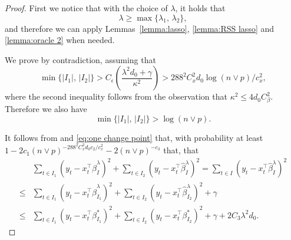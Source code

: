 \documentclass[twoside]{article}
\begin{document}
\begin{proof} 
First we notice that with the choice of $\lambda$, it holds that 
	\[
		\lambda \geq \max\{\lambda_1, \, \lambda_2\},
	\]
	and therefore we can apply Lemmas~\ref{lemma:lasso}, \ref{lemma:RSS lasso} and \ref{lemma:oracle 2} when needed.

We prove by contradiction, assuming that
	\begin{equation}\label{eq-contra}
		\min\{|I_1|, \, |I_2|\} > C_{\epsilon} \left(\frac{\lambda^2 d_0 + \gamma}{\kappa^2}\right) > 288^2 C^2_x d_0 \log(n \vee p)/c_x^2,
	\end{equation}
	where the second inequality follows from the observation that $\kappa^2 \leq 4 d_0 C^2_{\beta}$.  Therefore we also have
	\[
		\min\{|I_1|, \, |I_2|\} > \log(n \vee p).
	\]

It follows from  and \eqref{eq:one change point} that, with probability at least $1 - 2c_1 (n \vee p)^{-288^2C_x^2d_0c_2/c_x^2} - 2(n \vee p)^{-c_3}$ that, that
	\begin{align}
		& \sum_{t \in I_1}(y_t - x_t^{\top}\widehat{\beta}^\lambda_I)^2 + \sum_{t \in I_2}(y_t - x_t^{\top}\widehat{\beta}^\lambda_I)^2 = \sum_{ t\in I}(y_t - x_t^{\top}\widehat{\beta}^\lambda_I)^2  \nonumber \\
		\leq & \sum_{t \in I_1}(y_t - x_t^{\top}\widehat{\beta}^\lambda_{I_1})^2 + \sum_{t \in I_2}(y_t - x_t^{\top}\widehat{\beta}^\lambda_{I_2})^2 + \gamma \nonumber \\
		\leq & \sum_{t \in I_1}(y_t - x_t^{\top}\beta^*_{I_1})^2 + \sum_{t \in I_2}(y_t - x_t^{\top}\beta^*_{I_2})^2 + \gamma + 2C_3 \lambda^2 d_0. \label{eq-lem-1cp-pf-1}
	\end{align}


\end{proof}
\end{document}
